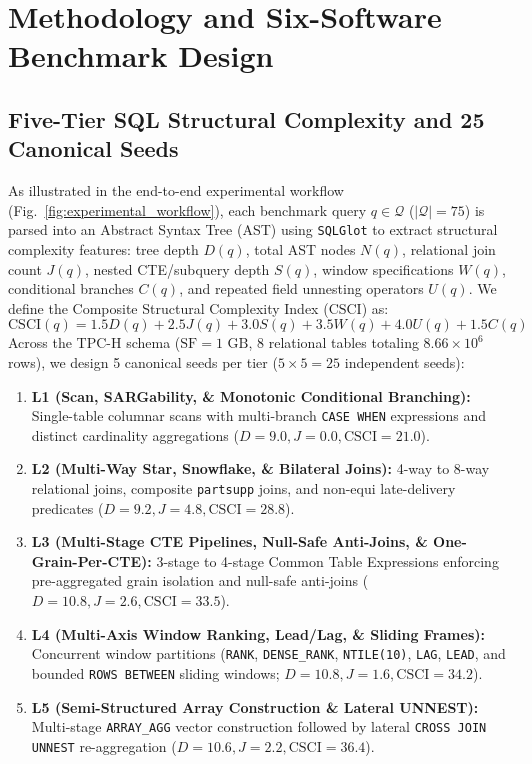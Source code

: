 \documentclass[10pt,a4paper]{article}
\begin{document}
\section{Methodology and Six-Software Benchmark Design}
\subsection{Five-Tier SQL Structural Complexity and 25 Canonical Seeds}
As illustrated in the end-to-end experimental workflow (Fig.~\ref{fig:experimental_workflow}), each benchmark query $q \in \mathcal{Q}$ ($|\mathcal{Q}|=75$) is parsed into an Abstract Syntax Tree (AST) using \texttt{SQLGlot} \cite{mao2024sqlglot} to extract structural complexity features: tree depth $D(q)$, total AST nodes $N(q)$, relational join count $J(q)$, nested CTE/subquery depth $S(q)$, window specifications $W(q)$, conditional branches $C(q)$, and repeated field unnesting operators $U(q)$. We define the Composite Structural Complexity Index ($\text{CSCI}$) as:
\begin{equation}
    \text{CSCI}(q) = 1.5 D(q) + 2.5 J(q) + 3.0 S(q) + 3.5 W(q) + 4.0 U(q) + 1.5 C(q)
\end{equation}
Across the TPC-H schema ($\text{SF}=1\text{ GB}$, 8 relational tables totaling $8.66\times 10^6$ rows), we design 5 canonical seeds per tier ($5 \times 5 = 25$ independent seeds):
\begin{enumerate}[leftmargin=1.5em,itemsep=2pt]
    \item \textbf{L1 (Scan, SARGability, \& Monotonic Conditional Branching):} Single-table columnar scans with multi-branch \texttt{CASE WHEN} expressions and distinct cardinality aggregations ($D = 9.0, J = 0.0, \text{CSCI} = 21.0$).
    \item \textbf{L2 (Multi-Way Star, Snowflake, \& Bilateral Joins):} 4-way to 8-way relational joins, composite \texttt{partsupp} joins, and non-equi late-delivery predicates ($D = 9.2, J = 4.8, \text{CSCI} = 28.8$).
    \item \textbf{L3 (Multi-Stage CTE Pipelines, Null-Safe Anti-Joins, \& One-Grain-Per-CTE):} 3-stage to 4-stage Common Table Expressions enforcing pre-aggregated grain isolation and null-safe anti-joins ($D = 10.8, J = 2.6, \text{CSCI} = 33.5$).
    \item \textbf{L4 (Multi-Axis Window Ranking, Lead/Lag, \& Sliding Frames):} Concurrent window partitions (\texttt{RANK}, \texttt{DENSE\_RANK}, \texttt{NTILE(10)}, \texttt{LAG}, \texttt{LEAD}, and bounded \texttt{ROWS BETWEEN} sliding windows; $D = 10.8, J = 1.6, \text{CSCI} = 34.2$).
    \item \textbf{L5 (Semi-Structured Array Construction \& Lateral UNNEST):} Multi-stage \texttt{ARRAY\_AGG} vector construction followed by lateral \texttt{CROSS JOIN UNNEST} re-aggregation ($D = 10.6, J = 2.2, \text{CSCI} = 36.4$).
\end{enumerate}
\end{document}
